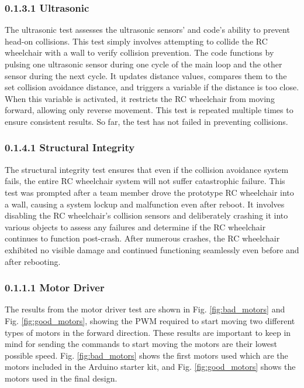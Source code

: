 \documentclass[conference]{IEEEtran}
\begin{document}
        \subsubsection{0.1.3.1 Ultrasonic}
        The ultrasonic test assesses the ultrasonic sensors' and code's ability to prevent head-on collisions. This test simply involves attempting to collide the RC wheelchair with a wall to verify collision prevention. The code functions by pulsing one ultrasonic sensor during one cycle of the main loop and the other sensor during the next cycle. It updates distance values, compares them to the set collision avoidance distance, and triggers a variable if the distance is too close. When this variable is activated, it restricts the RC wheelchair from moving forward, allowing only reverse movement. This test is repeated multiple times to ensure consistent results. So far, the test has not failed in preventing collisions. 
        
        \subsubsection{0.1.4.1 Structural Integrity}
        The structural integrity test ensures that even if the collision avoidance system fails, the entire RC wheelchair system will not suffer catastrophic failure. This test was prompted after a team member drove the prototype RC wheelchair into a wall, causing a system lockup and malfunction even after reboot. It involves disabling the RC wheelchair's collision sensors and deliberately crashing it into various objects to assess any failures and determine if the RC wheelchair continues to function post-crash. After numerous crashes, the RC wheelchair exhibited no visible damage and continued functioning seamlessly even before and after rebooting. 
        \subsubsection{0.1.1.1 Motor Driver}
        The results from the motor driver test are shown in Fig. \ref{fig:bad_motors} and Fig. \ref{fig:good_motors}, showing the PWM required to start moving two different types of motors in the forward direction. These results are important to keep in mind for sending the commands to start moving the motors are their lowest possible speed. Fig. \ref{fig:bad_motors} shows the first motors used which are the motors included in the Arduino starter kit, and Fig. \ref{fig:good_motors} shows the motors used in the final design. 
\end{document}

